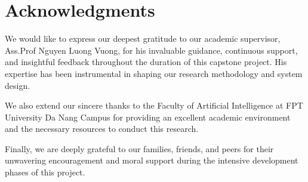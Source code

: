 \section*{Acknowledgments}

We would like to express our deepest gratitude to our academic supervisor, Ass.Prof Nguyen Luong Vuong, for his invaluable guidance, continuous support, and insightful feedback throughout the duration of this capstone project. His expertise has been instrumental in shaping our research methodology and system design.

We also extend our sincere thanks to the Faculty of Artificial Intelligence at FPT University Da Nang Campus for providing an excellent academic environment and the necessary resources to conduct this research.

Finally, we are deeply grateful to our families, friends, and peers for their unwavering encouragement and moral support during the intensive development phases of this project.
